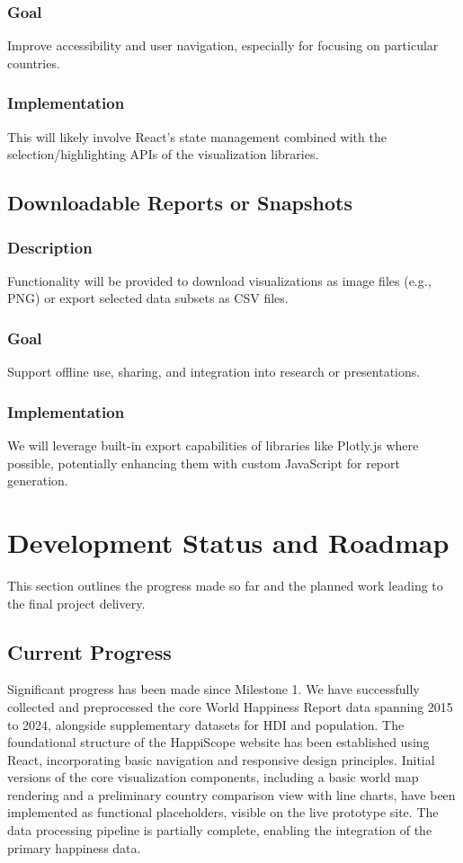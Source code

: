 \documentclass[10pt,conference,compsocconf]{IEEEtran}
\begin{document}
\subsubsection{Goal}
Improve accessibility and user navigation, especially for focusing on particular countries.
\subsubsection{Implementation}
This will likely involve React's state management combined with the selection/highlighting APIs of the visualization libraries.

\subsection{Downloadable Reports or Snapshots}
\subsubsection{Description}
Functionality will be provided to download visualizations as image files (e.g., PNG) or export selected data subsets as CSV files.
\subsubsection{Goal}
Support offline use, sharing, and integration into research or presentations.
\subsubsection{Implementation}
We will leverage built-in export capabilities of libraries like Plotly.js where possible, potentially enhancing them with custom JavaScript for report generation.

\section{Development Status and Roadmap} %
This section outlines the progress made so far and the planned work leading to the final project delivery.

\subsection{Current Progress} %
Significant progress has been made since Milestone 1. We have successfully collected and preprocessed the core World Happiness Report data spanning 2015 to 2024, alongside supplementary datasets for HDI and population. The foundational structure of the HappiScope website has been established using React, incorporating basic navigation and responsive design principles. Initial versions of the core visualization components, including a basic world map rendering and a preliminary country comparison view with line charts, have been implemented as functional placeholders, visible on the live prototype site. The data processing pipeline is partially complete, enabling the integration of the primary happiness data.
\end{document}
